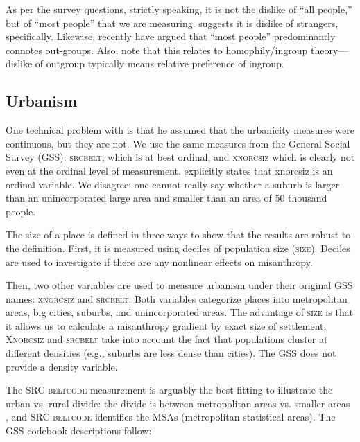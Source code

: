 \documentclass[10pt, letterpaper]{article}
\begin{document}
\begin{spacing}{1.4}
As per the survey questions, strictly speaking, it is not the dislike of ``all
people,'' but of ``most people''  that we are measuring. \citet{wilson85}
suggests it is dislike of strangers, specifically. Likewise, recently
\citet{delhey11} have argued that ``most people'' predominantly connotes
out-groups. {Also, note that this relates to homophily/ingroup theory---dislike of outgroup typically means relative preference of ingroup.} %
%


 
\subsection*{Urbanism}

One technical problem with \citet{wilson85} is that he assumed that the urbanicity measures were continuous, but they are not. We use the same measures from the General Social Survey (GSS): \textsc{srcbelt}, which is at best ordinal, and \textsc{xnorcsiz} which is clearly not even at the ordinal level of measurement.{\citet{wilson85}
explicitly states that xnorcsiz is an ordinal variable. We disagree: one cannot really say whether a suburb is larger than an unincorporated large area and smaller than an area of 50 thousand
people.}

The size of a place is defined in three ways to show that the
results are robust to the definition. First, it is measured using deciles of population size
(\textsc{size}). Deciles are used to investigate if there are any nonlinear
effects on misanthropy.

Then, two other variables are used to measure urbanism under their original GSS names: \textsc{xnorcsiz} and \textsc{srcbelt}. Both variables categorize places into metropolitan areas, big cities, suburbs, and  unincorporated areas. The advantage of \textsc{size} is that it allows us to calculate a misanthropy 
 gradient by exact size of settlement. \textsc{Xnorcsiz} and \textsc{srcbelt} take into account the fact that populations cluster at different densities (e.g., suburbs are less dense than cities). The GSS does not provide a density variable. 

The \textsc{SRC beltcode} measurement is arguably the best fitting to illustrate the
urban vs. rural divide: the divide is between metropolitan areas vs. smaller areas
\citep{hansonCityJournalautumn15}, and \textsc{SRC beltcode} identifies the MSAs
(metropolitan statistical areas). The GSS codebook descriptions follow: 


\end{spacing}
\end{document}
